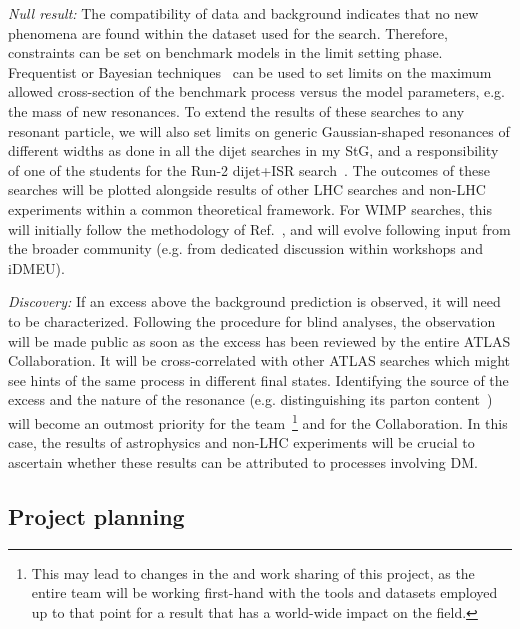 \textit{Null result:} The compatibility of data and background indicates that no new phenomena are found within the dataset used for the search. 
Therefore, constraints can be set on benchmark models in the limit setting phase. 
Frequentist or Bayesian techniques~\cite{ToBeCited} %
can be used to set limits on the maximum allowed cross-section of the benchmark process versus the model parameters, e.g. the mass of new resonances. 
To extend the results of these searches to any resonant particle, we will also set limits on generic Gaussian-shaped resonances of different widths as done in all the dijet searches in my StG, and a responsibility of one of the students for the Run-2 dijet+ISR search~\cite{ToBeCited}. %
The outcomes of these searches will be plotted alongside results of other LHC searches and non-LHC experiments within a common theoretical framework. 
For WIMP searches, this will initially follow the methodology of Ref.~\cite{ToBeCited}, %
and will evolve following input from the broader community (e.g. from dedicated discussion within workshops and iDMEU). 

\textit{Discovery:} If an excess above the background prediction is observed, it will need to be characterized. 
Following the procedure for blind analyses, the observation will be made public as soon as the excess has been reviewed by the entire ATLAS Collaboration. 
It will be cross-correlated with other ATLAS searches which might see hints of the same process in different final states. 
Identifying the source of the excess and the nature of the resonance (e.g. distinguishing its parton content~\cite{ToBeCited}) %
will become an outmost priority for the team~\footnote{This may lead to changes in the and work sharing of this project, as the entire team will be working first-hand with the tools and datasets employed up to that point for a result that has a world-wide impact on the field.} and for the Collaboration. 
In this case, the results of astrophysics and non-LHC experiments will be crucial to ascertain whether these results can be attributed to processes involving DM.

\subsection{Project planning}
\label{sub:ProjectPlanning}


\clearpage
\begingroup

    \linespread{0.9}\selectfont

\endgroup
  
